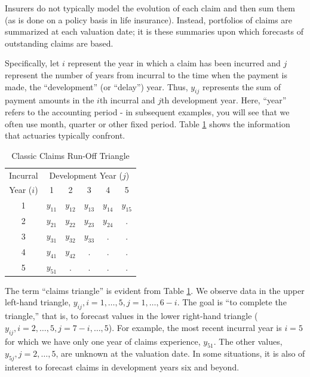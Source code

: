 Insurers do not typically model the evolution of each claim and then
sum them (as is done on a policy basis in life insurance). Instead,
portfolios of claims are summarized at each valuation date; it is
these summaries upon which forecasts of outstanding claims are
based.

Specifically, let $i$ represent the year in which a claim has been
incurred and $j$ represent the number of years from incurral to
the time when the payment is made, the ``development'' (or ``delay'') year. Thus,
$y_{ij}$ represents the sum of payment amounts in the $i$th incurral
and $j$th development year. Here, ``year'' refers to the accounting
period - in subsequent examples, you will see that we often use
month, quarter or other fixed period. Table \ref{T19:ClassicRunOff}
shows the information that actuaries typically confront.

\begin{center}  \begin{table}[h]
\caption{\label{T19:ClassicRunOff} Classic Claims Run-Off Triangle}
\begin{tabular}{c|ccccc}
  \hline
  Incurral &    \multicolumn{5}{c}{Development Year ($j$)}     \\
   Year ($i$) & 1& 2& 3&4&5 \\
   \hline
  1  & $y_{11}$  & $y_{12}$ & $y_{13} $&  $y_{14}$ & $y_{15}$  \\
  2  & $y_{21}$  & $y_{22}$ & $y_{23} $&  $y_{24}$ & .      \\
  3  & $y_{31}$  & $y_{32}$ & $y_{33} $&   .       & .      \\
  4  & $y_{41}$  & $y_{42}$ &  .       &.          & .      \\
  5  & $y_{51}$  & .        &  .       &.          & .      \\

  \hline
\end{tabular}
\end{table}  \end{center}

The term ``claims triangle'' is evident from Table
\ref{T19:ClassicRunOff}. We observe data in the upper left-hand
triangle, $y_{ij}, i=1,\ldots, 5, j=1, \ldots,6-i$. The goal is ``to
complete the triangle,'' that is, to forecast values in the lower
right-hand triangle ($y_{ij}, i=2,\ldots, 5, j=7-i, \ldots,5$). For
example, the most recent incurral year is $i=5$ for which we have
only one year of claims experience, $y_{51}$. The other values,
$y_{5j}, j=2, \ldots,5$, are unknown at the valuation date. In some
situations, it is also of interest to forecast claims in development
years six and beyond.

